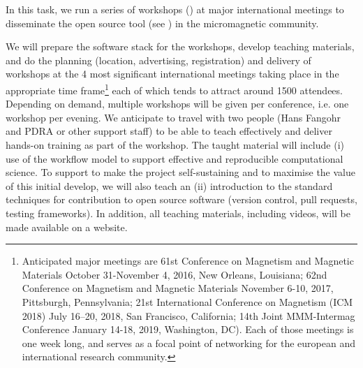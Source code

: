 \begin{workpackage}[id=dissem,wphases=18-48!.5,
  title=Dissemination and Community Building,
  lead=PS,
  PSRM=10, %
  SARM=18,
  USORM=10,
  USHRM=8,
  USRM=24,
  UVRM=2,
  UBRM=4,
]
\begin{tasklist}
\begin{task}[title=\OOMMFNB{} open source dissemination workshops,
id=dissemination-of-oommf-nb-workshops,lead=USO,PM=6]


  In this task, we run a series of workshops () at major international
  meetings to disseminate the open source \OOMMFNB{} tool (see 
) in the
  micromagnetic community.

  We will prepare the software stack for the workshops, develop
  teaching materials, and do the planning (location, advertising,
  registration) and delivery of workshops at the 4 most significant
  international meetings taking place in the appropriate time
  frame\footnote{Anticipated major meetings are 61st Conference on
    Magnetism and Magnetic Materials October 31-November 4, 2016, New
    Orleans, Louisiana; 62nd Conference on Magnetism and Magnetic
    Materials November 6-10, 2017, Pittsburgh, Pennsylvania; 21st
    International Conference on Magnetism (ICM 2018) July 16–20, 2018,
    San Francisco, California; 14th Joint MMM-Intermag Conference
    January 14-18, 2019, Washington, DC). Each of those meetings is
    one week long, and serves as a focal point of networking for the
    european and international research community.} each of which
  tends to attract around 1500 attendees. Depending on demand,
  multiple workshops will be given per conference, i.e. one workshop
  per evening. We anticipate to travel with two people (Hans Fangohr
  and PDRA or other support staff) to be able to teach effectively and
  deliver hands-on training as part of the workshop. The taught
  material will include (i) use of the \OOMMFNB{} workflow model to
  support effective and reproducible computational science.  
  To support to make the \OOMMFNB{} project self-sustaining and to
  maximise the value of this initial develop, we will also teach an
  (ii) introduction to the standard techniques for contribution to
  open source software (version control, pull requests, testing
  frameworks).  In addition, all teaching materials, including videos,
  will be made available on a website.


\end{task}
\end{tasklist}
\end{workpackage}
